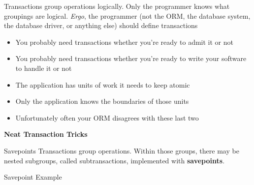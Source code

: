 \documentclass[svgnames]{beamer}
\begin{document}
\begin{frame}
    Transactions group operations logically. Only the programmer knows
    what groupings are logical. \textit{Ergo}, the programmer (not the ORM,
    the database system, the database driver, or anything else) should define
    transactions
    \begin{itemize}
        \item You probably need transactions whether you're ready to admit it
        or not
        \item You probably need transactions whether you're ready to write
        your software to handle it or not
        \item The application has units of work it needs to keep atomic
        \item Only the application knows the boundaries of those units
        \item Unfortunately often your ORM disagrees with these last two
    \end{itemize}
\end{frame}

\begin{frame}
    \begin{centering}
        \textbf{Neat Transaction Tricks}
        \par
    \end{centering}
\end{frame}

\begin{frame}{Savepoints}
    Transactions group operations. Within those groups, there may be nested
    subgroups, called subtransactions, implemented with \textbf{savepoints}.
\end{frame}

\begin{frame}{Savepoint Example}
\end{frame}
\end{document}

